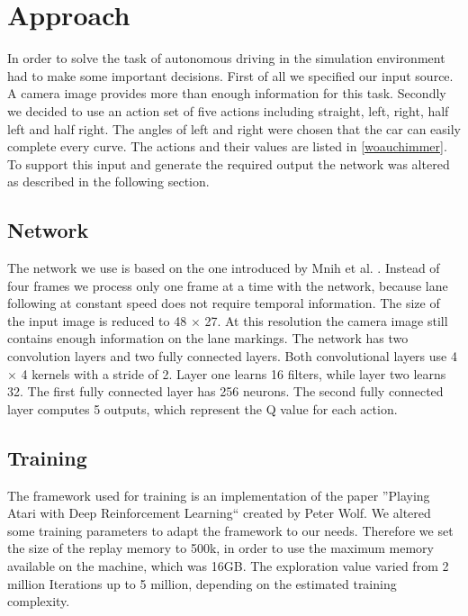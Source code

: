 
\section{Approach}

In order to solve the task of autonomous driving in the simulation environment had to make some important decisions. First of all we specified our input source. A camera image provides more than enough information for this task. Secondly we decided to use an action set of five actions including straight, left, right, half left and half right. The angles of left and right were chosen that the car can easily complete every curve. The actions and their values are listed in \ref{woauchimmer}. To support this input and generate the required output the network was altered as described in the following section.

\subsection{Network}
The network we use is based on the one introduced by Mnih et al. \cite{Mnih13}. Instead of four frames we process only one frame at a time with the network, because lane following at constant speed does not require temporal information. The size of the input image is reduced to 48 $\times$ 27. At this resolution the camera image still contains enough information on the lane markings. The network has two convolution layers and two fully connected layers. Both convolutional layers use 4 $\times$ 4 kernels with a stride of 2. Layer one learns 16 filters, while layer two learns 32. The first fully connected layer has 256 neurons. The second fully connected layer computes 5 outputs, which represent the Q value for each action.


\subsection{Training}
The framework used for training is an implementation of the paper ''Playing Atari with Deep Reinforcement Learning``  created by Peter Wolf. We altered some training parameters to adapt the framework to our needs. Therefore we set the size of the replay memory to 500k, in order to use the maximum memory available on the machine, which was 16GB. The exploration value varied from 2 million Iterations up to 5 million, depending on the estimated training complexity. 

